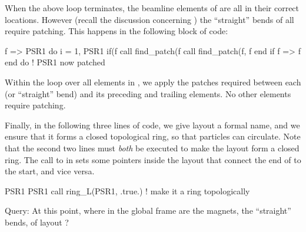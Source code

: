 %
When the above  loop terminates, the beamline elements of
 are all in their correct locations. However (recall the
discussion concerning ) the ``straight'' bends
of  all require patching. This happens in the following
block of code:
%
\begin{ptccode}
f => PSR1%
do i = 1, PSR1%
  if(f%
    call find_patch(f%
    call find_patch(f, f%
  end if
  f => f%
end do ! PSR1 now patched
\end{ptccode}
%
Within the  loop over all elements in , we apply
the patches required between each  (or ``straight'' bend)
and its preceding and trailing elements. No other elements require
patching. 

Finally, in the following three lines of code, we give layout 
a formal name, and we ensure that it forms a closed topological ring,
so that particles can circulate. Note that the second two lines must
\emph{both} be executed to make the layout  form a closed ring.
The call to  in  sets some pointers inside
the layout  that connect the end of  to the start,
and vice versa.
%
\begin{ptccode}
PSR1%
PSR1%
call ring_L(PSR1, .true.) ! make it a ring topologically \label{lin:psr1.ringL}
\end{ptccode}

Query: At this point, where in the global frame are the magnets,
the ``straight'' bends, of layout ?%

